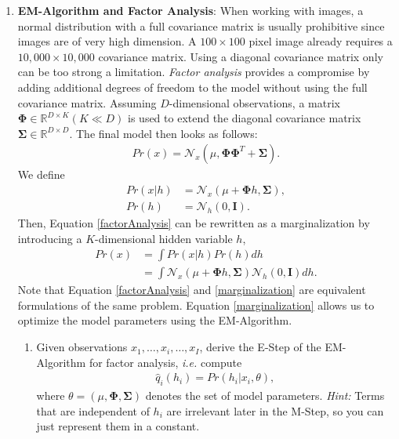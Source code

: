 \documentclass[11pt]{article}
\makeatletter
\newcommand{\mat}[1]{
    \mathbf{#1}
}
\def\IR{\mathbb{R}}
\def\ie{\emph{i.e.}\@\xspace}
\makeatother
\begin{document}
\begin{enumerate}
    \item \textbf{EM-Algorithm and Factor Analysis}:
    When working with images, a normal distribution with a full covariance matrix is usually prohibitive since images are of very high dimension. A $ 100 \times 100 $ pixel image already requires
    a $ 10,000 \times 10,000 $ covariance matrix. Using a diagonal covariance matrix only can be too strong a limitation. \textit{Factor analysis} provides a compromise by adding additional
    degrees of freedom to the model without using the full covariance matrix. Assuming $ D $-dimensional observations, a matrix $ \mathbf{\Phi} \in \IR^{D \times K} (K \ll D) $ is
    used to extend the diagonal covariance matrix $ \mat{\Sigma} \in \IR^{D \times D} $. The final model then looks as follows:
    \begin{align}
        Pr(x) = \mathcal{N}_{x}(\mu, \mat{\Phi}\mat{\Phi}^T + \mat{\Sigma}).
        \label{factorAnalysis}
    \end{align}
    We define
    \begin{align}
        Pr(x|h) &= \mathcal{N}_{x}(\mu + \mat{\Phi}h, \mat{\Sigma}), \\
        Pr(h)   &= \mathcal{N}_{h}(0,\mat{I}).
    \end{align}
    Then, Equation \eqref{factorAnalysis} can be rewritten as a marginalization by introducing a $ K $-dimensional hidden variable $ h $,
    \begin{align}
        Pr(x) &= \int Pr(x|h) Pr(h) dh \nonumber \\
              &= \int \mathcal{N}_{x}(\mu + \mat{\Phi}h, \mat{\Sigma}) \mathcal{N}_{h}(0,\mat{I}) dh.
        \label{marginalization}
    \end{align}
    Note that Equation \eqref{factorAnalysis} and \eqref{marginalization} are equivalent formulations of the same problem. Equation \eqref{marginalization} allows us to optimize the model
    parameters using the EM-Algorithm.
    \begin{enumerate}
        \item Given observations $ x_1,\dots,x_i,\dots,x_I $, derive the E-Step of the EM-Algorithm for factor analysis, \ie compute
              \begin{align*}
                  \hat q_i(h_i) = Pr(h_i | x_i, \theta),
              \end{align*}
              where $ \theta = (\mu, \mat{\Phi}, \mat{\Sigma}) $ denotes the set of model parameters.
              \textit{Hint:} Terms that are independent of $ h_i $ are irrelevant later in the M-Step, so you can just represent them in a constant.

\end{enumerate}
\end{enumerate}
\end{document}
